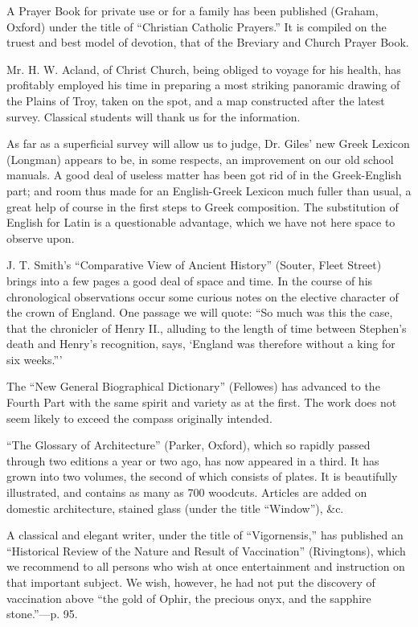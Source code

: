 A Prayer Book for private use or for a family has
been published (Graham, Oxford) under the title of ``Christian Catholic
Prayers.'' It is compiled on the truest and best model of devotion,
that of the Breviary and Church Prayer Book.

Mr. H. W. Acland, of Christ Church, being obliged
to voyage for his health, has profitably employed his time in preparing
a most striking panoramic drawing of the Plains of Troy, taken on the
spot, and a map constructed after the latest survey. Classical students
will thank us for the information.

As far as a superficial survey will allow us to
judge, Dr. Giles' new Greek Lexicon (Longman) appears to be, in some
respects, an improvement on our old school manuals. A good deal of
useless matter has been got rid of in the Greek-English part; and room
thus made for an English-Greek Lexicon much fuller than usual, a great
help of course in the first steps to Greek composition. The substitution
of English for Latin is a questionable advantage, which we have not here
space to observe upon.

J. T. Smith's ``Comparative View of Ancient
History'' (Souter, Fleet Street) brings into a few pages a good deal of
space and time. In the course of his chronological observations occur
some curious notes on the elective character of the crown of England.
One passage we will quote: ``So much was this the case, that the
chronicler of Henry II., alluding to the length of time between Stephen's death and Henry's recognition, says, ‘England was
therefore without a king for six weeks.'''

The ``New General Biographical Dictionary'' (Fellowes)
has advanced to the Fourth Part with the same spirit and variety as at
the first. The work does not seem likely to exceed the compass
originally intended.

``The Glossary of Architecture'' (Parker,
Oxford), which so rapidly passed through two editions a year or two ago,
has now appeared in a third. It has grown into two volumes, the second
of which consists of plates. It is beautifully illustrated, and contains
as many as 700 woodcuts. Articles are added on domestic architecture,
stained glass (under the title ``Window''), \&c.

A classical and elegant writer, under the title of ``Vigornensis,'' has published an
``Historical Review of the Nature
and Result of Vaccination'' (Rivingtons), which we recommend to all
persons who wish at once entertainment and instruction on that important
subject. We wish, however, he had not put the discovery of vaccination
above ``the gold of Ophir, the precious onyx, and the sapphire
stone.''—p. 95.

